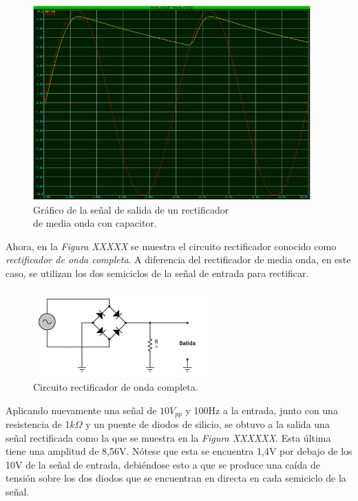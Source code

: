 \documentclass{article}
\begin{document}
\newpage
\begin{figure}[h]
	\centering
	\includegraphics[width=0.95\textwidth]{images/4-4-4-grafico-circuito-rectificador-media-onda-con-filtro.jpg}
	\caption{Gráfico de la señal de salida de un rectificador\\ de media onda con capacitor.}
\end{figure}
\bigskip\bigskip


	Ahora, en la \textit{Figura XXXXX} se muestra el circuito rectificador conocido como \textit{rectificador de onda completa}. A diferencia del rectificador de media onda, en este caso, se utilizan los dos semiciclos  de la señal de entrada para rectificar.
\bigskip\bigskip
	

\begin{figure}[h]
	\centering
	\includegraphics[width=0.60\textwidth]{images/4-4-5-circuito-rectificador-onda-completa.jpg}
	\medskip
	\caption{Circuito rectificador de onda completa.}
\end{figure}
\bigskip\bigskip


	Aplicando nuevamente una señal de $10V_{pp}$ y 100Hz a la entrada, junto con una resistencia de 1$k\Omega$ y un puente de diodos de silicio, se obtuvo a la salida una señal rectificada como la que se muestra en la \textit{Figura XXXXXX}. Esta última tiene una amplitud de 8,56V. Nótese que esta se encuentra 1,4V por debajo de los 10V de la señal de entrada, debiéndose esto a que se produce una caída de tensión sobre los dos diodos que se encuentran en directa en cada semiciclo de la señal. 
\bigskip
\end{document}
